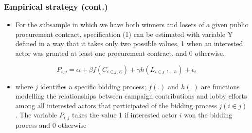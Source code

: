 \documentclass[handout,final,xcolor=dvipsnames]{beamer}
\begin{document}
  \begin{frame}\frametitle{Empirical strategy (cont.)}
  \begin{itemize}\itemsep 10pt
  \item For the subsample in which we have both winners and
losers of a given public procurement contract, specification (1) can
be estimated with variable Y defined in a way that it takes only two
possible values, 1 when an interested actor was granted at least one
procurement contract, and 0 otherwise.
  \end{itemize}
  \begin{equation}
P_{i,j}=\alpha+\beta f(C_{i \in j,E})+\gamma h(L_{i \in j,t+h})+\epsilon_{i}
\end{equation}
\begin{itemize}
\item where $j$ identifies a specific bidding process; $f(.)$ and
$h(.)$ are functions modelling the relationships between campaign
contributions and lobby efforts among all interested actors that
participated of the bidding process $j (i \in j)$. The variable $P_{i,j}$ takes the value 1 if interested actor $i$ won the bidding process and 0 otherwise\
  \end{itemize}
\end{frame}
  
\end{document}

